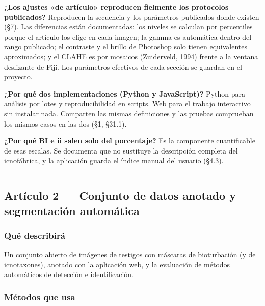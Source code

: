 \documentclass[
  10pt,
]{article}
\begin{document}
\textbf{¿Los ajustes «de artículo» reproducen fielmente los protocolos
publicados?} Reproducen la secuencia y los parámetros publicados donde
existen (§7). Las diferencias están documentadas: los niveles se
calculan por percentiles porque el artículo los elige en cada imagen; la
gamma es automática dentro del rango publicado; el contraste y el brillo
de Photoshop solo tienen equivalentes aproximados; y el CLAHE es por
mosaicos (Zuiderveld, 1994) frente a la ventana deslizante de Fiji. Los
parámetros efectivos de cada sección se guardan en el proyecto.

\textbf{¿Por qué dos implementaciones (Python y JavaScript)?} Python
para análisis por lotes y reproducibilidad en scripts. Web para el
trabajo interactivo sin instalar nada. Comparten las mismas definiciones
y las pruebas comprueban los mismos casos en las dos (§1, §31.1).

\textbf{¿Por qué BI e ii salen solo del porcentaje?} Es la componente
cuantificable de esas escalas. Se documenta que no sustituye la
descripción completa del icnofábrica, y la aplicación guarda el índice
manual del usuario (§4.3).

\begin{center}\rule{0.5\linewidth}{0.5pt}\end{center}

\hypertarget{artuxedculo-2-conjunto-de-datos-anotado-y-segmentaciuxf3n-automuxe1tica}{%
\subsection{Artículo 2 --- Conjunto de datos anotado y segmentación
automática}\label{artuxedculo-2-conjunto-de-datos-anotado-y-segmentaciuxf3n-automuxe1tica}}

\hypertarget{quuxe9-describiruxe1}{%
\subsubsection{Qué describirá}\label{quuxe9-describiruxe1}}

Un conjunto abierto de imágenes de testigos con máscaras de bioturbación
(y de icnotaxones), anotado con la aplicación web, y la evaluación de
métodos automáticos de detección e identificación.

\hypertarget{muxe9todos-que-usa-1}{%
\subsubsection{Métodos que usa}\label{muxe9todos-que-usa-1}}
\end{document}
